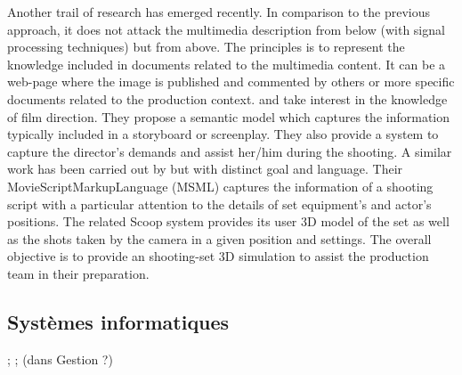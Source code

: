 Another trail of research has emerged recently. In comparison to the previous approach, it does not attack the multimedia description from below (with signal processing techniques) but from above. The principles is to represent the knowledge included in documents related to the multimedia content. It can be a web-page where the image is published and commented by others \cite{Simperl2009} or more specific documents related to the production context. \cite{Chakravarthy2009b} and \cite{Chakravarthy2009c} take interest in the knowledge of film direction. They propose a semantic model which captures the information typically included in a storyboard or screenplay. They also provide a system to capture the director's demands and assist her/him during the shooting. 
A similar work has been carried out by \cite{VanRijsselbergen2009} but with distinct goal and language. Their MovieScriptMarkupLanguage (MSML) captures the information of a shooting script with a particular attention to the details of set equipment's and actor's positions. The related Scoop system \cite{Cardinaels2008} provides its user 3D model of the set as well as the shots taken by the camera in a given position and settings. The overall objective is to provide an shooting-set 3D simulation to assist the production team in their preparation.\\






\subsection{Systèmes informatiques}
\cite{Tsinaraki2005} ; \cite{Tsinaraki2004} ; \cite{Dasiopoulou2009} (dans Gestion ?)




